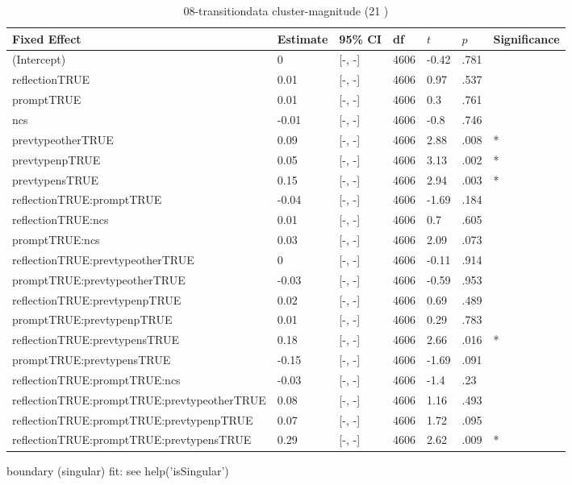 \documentclass{article}
\begin{document}
\begin{table}[h]
                    \caption{08-transitiondata cluster-magnitude (21 )}
                    \label{label}
                    \centering \begin{tabular}{lllllll}
                 \toprule
                 Fixed Effect     & Estimate     & 95\% CI  &  df & $t$ & $p$ & Significance \\
                 \midrule 
   (Intercept) & 0 &  [-, -] & 4606 & -0.42 & .781 &   \\ 
   reflectionTRUE & 0.01 &  [-, -] & 4606 & 0.97 & .537 &   \\ 
   promptTRUE & 0.01 &  [-, -] & 4606 & 0.3 & .761 &   \\ 
   ncs & -0.01 &  [-, -] & 4606 & -0.8 & .746 &   \\ 
   prevtypeotherTRUE & 0.09 &  [-, -] & 4606 & 2.88 & .008 & * \\ 
   prevtypenpTRUE & 0.05 &  [-, -] & 4606 & 3.13 & .002 & * \\ 
   prevtypensTRUE & 0.15 &  [-, -] & 4606 & 2.94 & .003 & * \\ 
   \cmidrule{1-7}
   reflectionTRUE:promptTRUE & -0.04 &  [-, -] & 4606 & -1.69 & .184 &   \\ 
   reflectionTRUE:ncs & 0.01 &  [-, -] & 4606 & 0.7 & .605 &   \\ 
   promptTRUE:ncs & 0.03 &  [-, -] & 4606 & 2.09 & .073 &   \\ 
   reflectionTRUE:prevtypeotherTRUE & 0 &  [-, -] & 4606 & -0.11 & .914 &   \\ 
   promptTRUE:prevtypeotherTRUE & -0.03 &  [-, -] & 4606 & -0.59 & .953 &   \\ 
   reflectionTRUE:prevtypenpTRUE & 0.02 &  [-, -] & 4606 & 0.69 & .489 &   \\ 
   promptTRUE:prevtypenpTRUE & 0.01 &  [-, -] & 4606 & 0.29 & .783 &   \\ 
   reflectionTRUE:prevtypensTRUE & 0.18 &  [-, -] & 4606 & 2.66 & .016 & * \\ 
   promptTRUE:prevtypensTRUE & -0.15 &  [-, -] & 4606 & -1.69 & .091 &   \\ 
   \cmidrule{1-7}
   reflectionTRUE:promptTRUE:ncs & -0.03 &  [-, -] & 4606 & -1.4 & .23 &   \\ 
   reflectionTRUE:promptTRUE:prevtypeotherTRUE & 0.08 &  [-, -] & 4606 & 1.16 & .493 &   \\ 
   reflectionTRUE:promptTRUE:prevtypenpTRUE & 0.07 &  [-, -] & 4606 & 1.72 & .095 &   \\ 
   reflectionTRUE:promptTRUE:prevtypensTRUE & 0.29 &  [-, -] & 4606 & 2.62 & .009 & * \\ 
   \bottomrule
          \end{tabular}
          \end{table}
boundary (singular) fit: see help('isSingular')  \\
\end{document}
